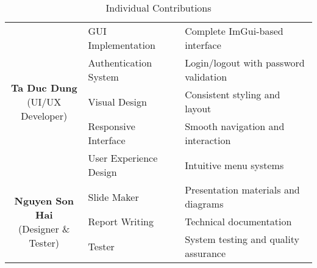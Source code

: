 \begin{center}
\begin{table}[H]
\begin{tabularx}{\textwidth}{| c | l | X |}
			\multirow{5}{*}{\parbox{3.5cm}{\centering\textbf{Ta Duc Dung}                                       \\ \small{(UI/UX Developer)}}}
			              & GUI Implementation          & Complete ImGui-based interface                        \\
			\cline{2-3}
			              & Authentication System       & Login/logout with password validation                 \\
			\cline{2-3}
			              & Visual Design               & Consistent styling and layout                         \\
			\cline{2-3}
			              & Responsive Interface        & Smooth navigation and interaction                     \\
			\cline{2-3}
			              & User Experience Design      & Intuitive menu systems                                \\
			\hline

			\multirow{4}{*}{\parbox{3.5cm}{\centering\textbf{Nguyen Son Hai}                                    \\ \small{(Designer \& Tester)}}}
			              & Slide Maker                 & Presentation materials and diagrams                   \\
			\cline{2-3}
			              & Report Writing              & Technical documentation                               \\
			\cline{2-3}
			              & Tester                      & System testing and quality assurance                  \\
			\hline
		\end{tabularx}
		\caption{Individual Contributions}
	\end{table}
\end{center}

\newpage

